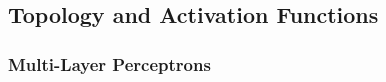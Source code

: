 %  
%
%
%
%  
%
%


\subsection{Topology and Activation Functions}

\begin{frame}
  \frametitle{Multi-Layer Perceptrons}


  \begin{center}
    \resizebox{.8\linewidth}{!}{
      
    }
  \end{center}
\end{frame}


